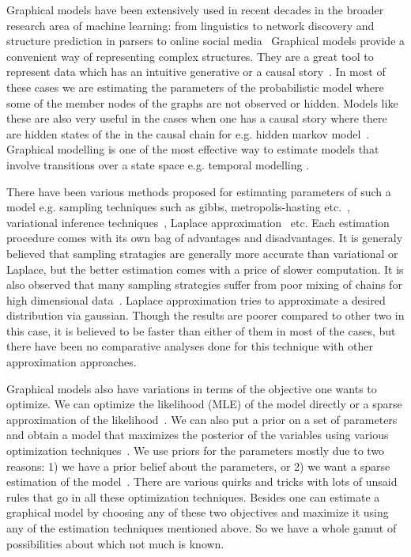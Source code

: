 Graphical models have been extensively used in recent decades in the
broader research area of machine learning: from linguistics to network discovery and
structure prediction in parsers to online social media~\cite{Koller+Friedman:09}
Graphical models provide a convenient way of  representing complex structures.
They are a great tool to represent data which has an intuitive generative
or a causal story~\cite{GettingStarted}. In most of these cases we are
estimating the parameters of the probabilistic model where some of the member
nodes of the graphs are not observed or hidden. Models like these are also very
useful in the cases when one has a causal story where there are hidden states of
the in the causal chain for e.g. hidden markov model~\cite{Baum1967}. Graphical
modelling is one of the most effective way to estimate models that involve
transitions over a state space e.g. temporal modelling
\cite{Arnold:2007:TCM:1281192.1281203}. 

There have been various methods
proposed for estimating parameters of such a model e.g. sampling
techniques such as gibbs, metropolis-hasting
etc.~\cite{Robert:2005:MCS:1051451}, variational inference 
techniques~\cite{citeulike:6420690}, Laplace
approximation~\cite{Azevedo-Filho:1994} etc. Each estimation procedure comes
with its own bag of advantages and disadvantages. It is generaly believed that
sampling stratagies are generally more accurate than variational or Laplace,
but the better estimation comes with a price of slower computation. It is also
observed that many sampling strategies suffer from poor mixing of chains for
high dimensional data~\cite{ShenACOSB10}. Laplace approximation tries to
approximate a desired distribution via gaussian. Though the results are poorer
compared to other two in this case, it is believed to be faster than either of
them in most of the cases, but there have been no comparative analyses done for
this technique with other approximation approaches. 

Graphical models also have
variations in terms of the objective one wants to optimize. We can optimize
the likelihood (MLE) of the model directly or a sparse approximation of the
likelihood~\cite{Banerjee:2008}. We can also put a prior on a set of parameters
and obtain a model that maximizes the posterior of the variables using various
optimization techniques~\cite{abs-0710-0013}. We use priors for the parameters
mostly due to two reasons: 1) we have a prior belief about the parameters, or 2)
we want a sparse estimation of the model~\cite{Yoshida:2010}. There are various
quirks and tricks with lots of unsaid rules that go in all these optimization
techniques. Besides one can estimate a graphical model by choosing any of these
two objectives and maximize it using any of the estimation techniques mentioned
above. So we have a whole gamut of possibilities about which not much is known. 


